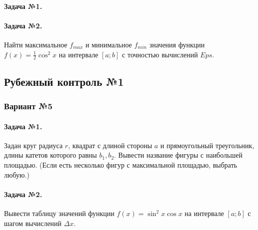 \documentclass[12pt,a4paper]{report}
\begin{document}
\paragraph*{Задача №1.}
\paragraph*{Задача №2.} Найти максимальное $f_{max}$ и минимальное $f_{min}$ значения функции $f(x)=\frac{1}{2} \cos^2 x$ на интервале $[a; b]$ с точностью вычислений $Eps$.

\subsection*{Рубежный контроль №1}
\subsubsection*{Вариант №5}
\paragraph*{Задача №1.} Задан круг радиуса $r$, квадрат с длиной стороны $a$ и прямоугольный треугольник, длины катетов которого равны $b_1, b_2$. Вывести название фигуры с наибольшей площадью. (Если есть несколько фигур с максимальной площадью, выбрать любую.)
\paragraph*{Задача №2.} Вывести таблицу значений функции $f(x) = \sin^2 x \cos x$ на интервале $[a; b]$ с шагом вычислений $\Delta x$.
\end{document}
